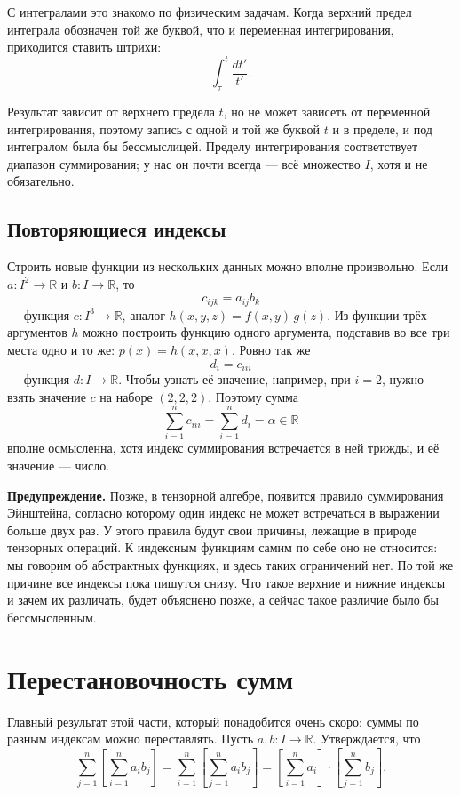 \documentclass[11pt,a4paper]{article}
\begin{document}
С интегралами это знакомо по физическим задачам. Когда верхний предел интеграла обозначен той же буквой, что и переменная интегрирования, приходится ставить штрихи:
\[
\int_{\tau}^{t} \frac{dt'}{t'}.
\]

Результат зависит от верхнего предела $t$, но не может зависеть от переменной интегрирования, поэтому запись с одной и той же буквой $t$ и в пределе, и под интегралом была бы бессмыслицей. Пределу интегрирования соответствует диапазон суммирования; у нас он почти всегда — всё множество $I$, хотя и не обязательно.

\subsection{Повторяющиеся индексы}

Строить новые функции из нескольких данных можно вполне произвольно. Если $a\colon I^2 \to \mathbb{R}$ и $b\colon I \to \mathbb{R}$, то
\[
c_{ijk} = a_{ij} b_k
\]
— функция $c\colon I^3 \to \mathbb{R}$, аналог $h(x, y, z) = f(x, y)\, g(z)$. Из функции трёх аргументов $h$ можно построить функцию одного аргумента, подставив во все три места одно и то же: $p(x) = h(x, x, x)$. Ровно так же
\[
d_i = c_{iii}
\]
— функция $d\colon I \to \mathbb{R}$. Чтобы узнать её значение, например, при $i = 2$, нужно взять значение $c$ на наборе $(2, 2, 2)$. Поэтому сумма
\[
\sum_{i=1}^{n} c_{iii} = \sum_{i=1}^{n} d_i = \alpha \in \mathbb{R}
\]
вполне осмысленна, хотя индекс суммирования встречается в ней трижды, и её значение — число.

\textbf{Предупреждение.} Позже, в тензорной алгебре, появится правило суммирования Эйнштейна, согласно которому один индекс не может встречаться в выражении больше двух раз. У этого правила будут свои причины, лежащие в природе тензорных операций. К индексным функциям самим по себе оно не относится: мы говорим об абстрактных функциях, и здесь таких ограничений нет. По той же причине все индексы пока пишутся снизу. Что такое верхние и нижние индексы и зачем их различать, будет объяснено позже, а сейчас такое различие было бы бессмысленным.

\section{Перестановочность сумм}

Главный результат этой части, который понадобится очень скоро: суммы по разным индексам можно переставлять. Пусть $a, b\colon I \to \mathbb{R}$. Утверждается, что
\[
\sum_{j=1}^{n} \left[ \sum_{i=1}^{n} a_i b_j \right]
= \sum_{i=1}^{n} \left[ \sum_{j=1}^{n} a_i b_j \right]
= \left[ \sum_{i=1}^{n} a_i \right] \cdot \left[ \sum_{j=1}^{n} b_j \right].
\]
\end{document}
